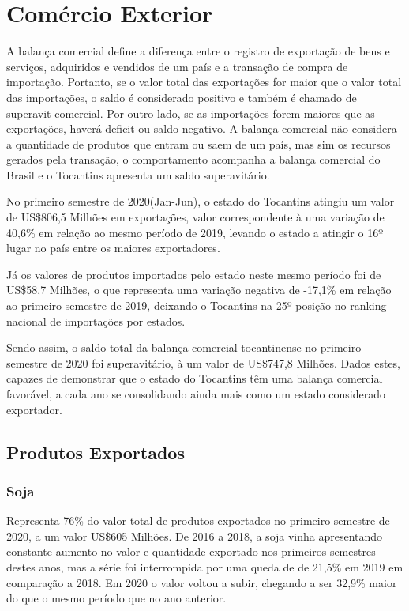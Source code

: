 \chapter{Comércio Exterior}

\par A balança comercial define a diferença entre o registro de exportação de bens e serviços, adquiridos e vendidos de um país e a transação de compra de importação. Portanto, se o valor total das exportações for maior que o valor total das importações, o saldo é considerado positivo e também é chamado de superavit comercial. Por outro lado, se as importações forem maiores que as exportações, haverá deficit ou saldo negativo. A balança comercial não considera a quantidade de produtos que entram ou saem de um país, mas sim os recursos gerados pela transação, o comportamento acompanha a balança comercial do Brasil e o Tocantins apresenta um saldo superavitário.


\par No primeiro semestre de 2020(Jan-Jun), o estado do Tocantins atingiu um valor de US\$806,5 Milhões em exportações, valor correspondente à uma variação de 40,6\% em relação ao mesmo período de 2019, levando o estado a atingir o 16º lugar no país entre os maiores exportadores. 

\par Já os valores de produtos importados pelo estado neste mesmo período foi de US\$58,7 Milhões, o que representa uma variação negativa de -17,1\% em relação ao primeiro semestre de 2019, deixando o Tocantins na 25º posição no ranking nacional de importações por estados.

\par Sendo assim, o saldo total da balança comercial tocantinense no primeiro semestre de 2020 foi superavitário, à um valor de US\$747,8 Milhões. Dados estes, capazes de demonstrar que o estado do Tocantins têm uma balança comercial favorável, a cada ano se consolidando ainda mais como um estado considerado exportador.

\section{Produtos Exportados}
\subsection{Soja}

\par Representa 76\% do valor total de produtos exportados no primeiro semestre de 2020, a um valor US\$605 Milhões. De 2016 a 2018, a soja vinha apresentando constante aumento no valor e quantidade exportado nos primeiros semestres destes anos, mas a série foi interrompida por uma queda de de 21,5\% em 2019 em comparação a 2018. Em 2020 o valor voltou a subir, chegando a ser 32,9\% maior do que o mesmo período que no ano anterior.

